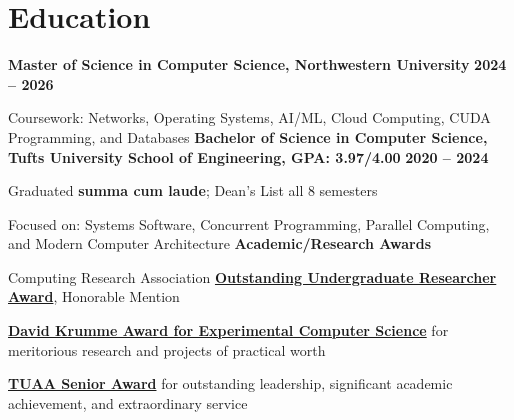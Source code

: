 \documentclass[10pt]{article}
\newenvironment{mylist}[1][]
{\itemize[nosep, wide=0pt, leftmargin=*, after=\strut]}
{\enditemize}
\begin{document}
\section{Education}
\begin{minipage}[t]{\linewidth}
    \textbf{Master of Science in Computer Science, Northwestern University } \hfill \textbf{2024 -- 2026}
    \begin{mylist}
        \item Coursework: Networks, Operating Systems, AI/ML, Cloud Computing, CUDA Programming, and Databases
    \end{mylist}
    \vspace{0.5em}
    \textbf{Bachelor of Science in Computer Science, Tufts University School of Engineering, GPA: 3.97/4.00} \hfill \textbf{2020 -- 2024}
    \begin{mylist}
        \item Graduated \textbf{summa cum laude}; Dean's List all 8 semesters
        \item Focused on: Systems Software, Concurrent Programming, Parallel Computing, and Modern Computer Architecture
    \end{mylist}
    \vspace{0.5em}
    \textbf{Academic/Research Awards}
    \begin{mylist}
        \item Computing Research Association \href{https://engineering.tufts.edu/cs/research/undergraduate-research/undergrad-research-award-nominees}{\textbf{Outstanding Undergraduate Researcher Award}}, Honorable Mention
        \item \href{https://engineering.tufts.edu/cs/news-events/awards}{\textbf{David Krumme Award for Experimental Computer Science}} for  meritorious research and projects of practical worth
        \item \href{https://alumniandfriends.tufts.edu/2024-senior-awardee-liam-strand-e24}{\textbf{TUAA Senior Award}} for outstanding leadership, significant academic achievement, and extraordinary service
    \end{mylist}

\end{minipage}
\end{document}
